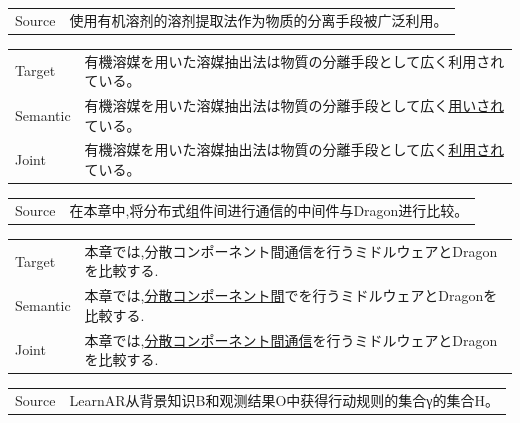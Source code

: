 \vspace{0.1cm}
\begin{table}[h]
    \centering
    \begin{CJK}{UTF8}{gbsn}
        \begin{tabularx}{\textwidth}{p{1.2cm}b}\toprule
            Source & 使用有机溶剂的溶剂提取法作为物质的分离手段被广泛利用。 \\
        \end{tabularx}
    \end{CJK}

    \begin{CJK}{UTF8}{ipxm}
        \begin{tabularx}{\textwidth}{p{1.2cm}b}
            Target & 有機溶媒を用いた溶媒抽出法は物質の分離手段として広く利用されている。 \\
            Semantic & 有機溶媒を用いた溶媒抽出法は物質の分離手段として広く\underline{用いされ}ている。 \\
            Joint & 有機溶媒を用いた溶媒抽出法は物質の分離手段として広く\underline{利用され}ている。 \\\midrule
        \end{tabularx}
    \end{CJK}

    \begin{CJK}{UTF8}{gbsn}
        \begin{tabularx}{\textwidth}{p{1.2cm}b}
            Source & 在本章中,将分布式组件间进行通信的中间件与Dragon进行比较。 \\
        \end{tabularx}
    \end{CJK}

    \begin{CJK}{UTF8}{ipxm}
        \begin{tabularx}{\textwidth}{p{1.2cm}b}
            Target & 本章では,分散コンポーネント間通信を行うミドルウェアとDragonを比較する. \\
            Semantic & 本章では,\underline{分散コンポーネント間}でを行うミドルウェアとDragonを比較する. \\
            Joint & 本章では,\underline{分散コンポーネント間通信}を行うミドルウェアとDragonを比較する. \\\midrule
        \end{tabularx}
    \end{CJK}

    \begin{CJK}{UTF8}{gbsn}
        \begin{tabularx}{\textwidth}{p{1.2cm}b}
            Source & LearnAR从背景知识B和观测结果O中获得行动规则的集合γ的集合H。 \\
        \end{tabularx}
    \end{CJK}


\end{table}
